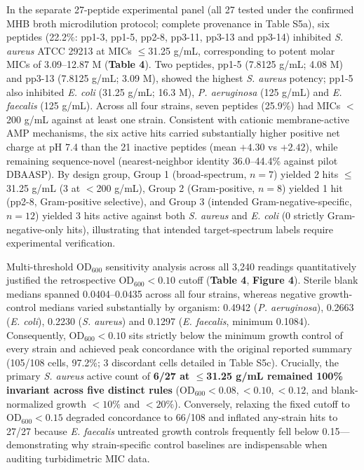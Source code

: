 \documentclass[unnumsec,webpdf,contemporary,large]{oup-authoring-template}
\newcommand{\rev}[1]{#1}
\begin{document}
In the separate 27-peptide experimental panel (all 27 tested under the confirmed MHB broth microdilution protocol; complete provenance in Table S5a), six peptides (22.2\%: pp1-3, pp1-5, pp2-8, pp3-11, pp3-13 and pp3-14) inhibited \textit{S. aureus} ATCC 29213 at MICs $\leq$31.25 \textmu{}g/mL, \rev{corresponding to potent molar MICs of 3.09--12.87 \textmu{}M (\textbf{Table 4}).} Two peptides, pp1-5 (7.8125 \textmu{}g/mL; 4.08 \textmu{}M) and pp3-13 (7.8125 \textmu{}g/mL; 3.09 \textmu{}M), showed the highest \textit{S. aureus} potency; pp1-5 also inhibited \textit{E. coli} (31.25 \textmu{}g/mL; 16.3 \textmu{}M), \textit{P. aeruginosa} (125 \textmu{}g/mL) and \textit{E. faecalis} (125 \textmu{}g/mL). Across all four strains, seven peptides (25.9\%) had MICs $<$200 \textmu{}g/mL against at least one strain. \rev{Consistent with cationic membrane-active AMP mechanisms, the six active hits carried substantially higher positive net charge at pH 7.4 than the 21 inactive peptides (mean $+4.30$ vs $+2.42$), while remaining sequence-novel (nearest-neighbor identity 36.0--44.4\% against pilot DBAASP). By design group, Group 1 (broad-spectrum, $n=7$) yielded 2 hits $\leq$31.25 \textmu{}g/mL (3 at $<$200 \textmu{}g/mL), Group 2 (Gram-positive, $n=8$) yielded 1 hit (pp2-8, Gram-positive selective), and Group 3 (intended Gram-negative-specific, $n=12$) yielded 3 hits active against both \textit{S. aureus} and \textit{E. coli} (0 strictly Gram-negative-only hits), illustrating that intended target-spectrum labels require experimental verification.}

\rev{Multi-threshold OD$_{600}$ sensitivity analysis across all 3,240 readings quantitatively justified the retrospective OD$_{600}<0.10$ cutoff (\textbf{Table 4}, \textbf{Figure 4}). Sterile blank medians spanned 0.0404--0.0435 across all four strains, whereas negative growth-control medians varied substantially by organism: 0.4942 (\textit{P. aeruginosa}), 0.2663 (\textit{E. coli}), 0.2230 (\textit{S. aureus}) and 0.1297 (\textit{E. faecalis}, minimum 0.1084). Consequently, OD$_{600}<0.10$ sits strictly below the minimum growth control of every strain and achieved peak concordance with the original reported summary (105/108 cells, 97.2\%; 3 discordant cells detailed in Table S5c). Crucially, the primary \textit{S. aureus} active count of \textbf{6/27 at $\leq$31.25 \textmu{}g/mL remained 100\% invariant across five distinct rules} (OD$_{600}<0.08, <0.10, <0.12$, and blank-normalized growth $<10\%$ and $<20\%$). Conversely, relaxing the fixed cutoff to OD$_{600}<0.15$ degraded concordance to 66/108 and inflated any-strain hits to 27/27 because \textit{E. faecalis} untreated growth controls frequently fell below 0.15---demonstrating why strain-specific control baselines are indispensable when auditing turbidimetric MIC data.}
\end{document}
